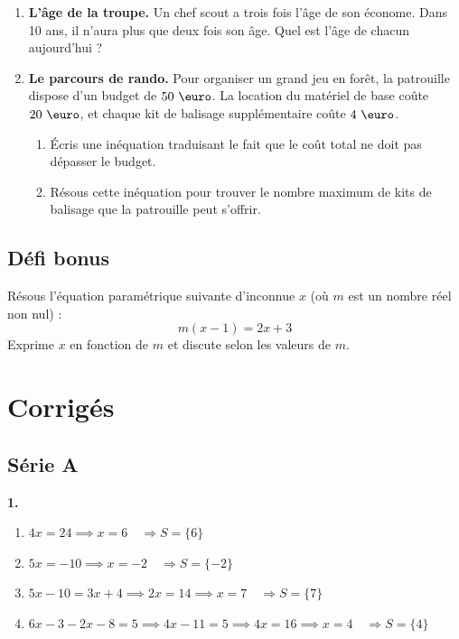 \documentclass[../main.tex]{subfiles}
\begin{document}
\begin{enumerate}[label=\textbf{\arabic*.},start=4]

\item \textbf{L'âge de la troupe.} Un chef scout a trois fois l'âge de son économe. Dans 10 ans, il n'aura plus que deux fois son âge. Quel est l'âge de chacun aujourd'hui ?

\item \textbf{Le parcours de rando.} Pour organiser un grand jeu en forêt, la patrouille dispose d'un budget de $50\ \text{\euro}$. La location du matériel de base coûte $20\ \text{\euro}$, et chaque kit de balisage supplémentaire coûte $4\ \text{\euro}$. 
\begin{enumerate}[label=\alph*)]
  \item Écris une inéquation traduisant le fait que le coût total ne doit pas dépasser le budget.
  \item Résous cette inéquation pour trouver le nombre maximum de kits de balisage que la patrouille peut s'offrir.
\end{enumerate}

\end{enumerate}

\subsection{Défi bonus}

Résous l'équation paramétrique suivante d'inconnue $x$ (où $m$ est un nombre réel non nul) :
\[
m(x - 1) = 2x + 3
\]
Exprime $x$ en fonction de $m$ et discute selon les valeurs de $m$.

\newpage
\section{Corrigés}

\subsection*{Série A}

\textbf{1.} 
\begin{enumerate}[label=\alph*)]
  \item $4x = 24 \implies x = 6 \quad \Rightarrow S = \{6\}$
  \item $5x = -10 \implies x = -2 \quad \Rightarrow S = \{-2\}$
  \item $5x - 10 = 3x + 4 \implies 2x = 14 \implies x = 7 \quad \Rightarrow S = \{7\}$
  \item $6x - 3 - 2x - 8 = 5 \implies 4x - 11 = 5 \implies 4x = 16 \implies x = 4 \quad \Rightarrow S = \{4\}$
\end{enumerate}
\end{document}

